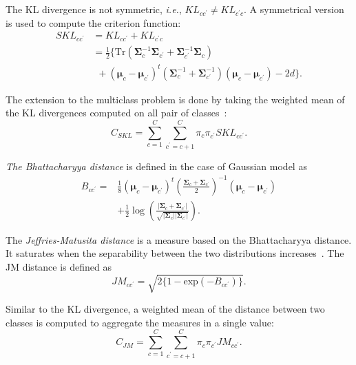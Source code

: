 \documentclass[journal,10pt]{IEEEtran}
\begin{document}
        The    KL   divergence    is   not    symmetric,   \emph{i.e.},
        $KL_{cc^\prime} \ne KL_{c^\prime c}$.  A symmetrical version  is used to
        compute the criterion function:
        \begin{align}\label{eq:skl}
          SKL_{cc^\prime} &=KL_{cc^\prime} + KL_{c^\prime c} \nonumber \\
            &= \frac{1}{2} \biggl\{ \text{Tr} (\boldsymbol{\Sigma}_c^{-1} \boldsymbol{\Sigma}_{c^\prime} + \boldsymbol{\Sigma}_{c^\prime}^{-1} \boldsymbol{\Sigma}_c) \nonumber \\
            &~~+ (\boldsymbol{\mu}_c - \boldsymbol{\mu}_{c^\prime})^t (\boldsymbol{\Sigma}_c^{-1} + \boldsymbol{\Sigma}_{c^\prime}^{-1}) (\boldsymbol{\mu}_c - \boldsymbol{\mu}_{c^\prime}) - 2d \biggr\}.
        \end{align}

        The extension  to the multiclass  problem is done  by taking
        the weighted mean  of the KL divergences computed  on all pair
        of classes~\cite{bruzzone1995extension}:
        \begin{equation}
            C_{SKL} = \sum_{c=1}^{C} \sum_{c^\prime = c + 1}^{C} \pi_c \pi_{c^\prime} SKL_{cc^\prime}.
        \end{equation}

        \emph{The Bhattacharyya distance} is defined in the case of Gaussian model as
        \begin{align}
            {B}_{cc^\prime} = &\frac{1}{8} (\boldsymbol{\mu}_c - \boldsymbol{\mu}_{c^\prime})^t \left( \frac{\boldsymbol{\Sigma}_c + \boldsymbol{\Sigma}_{c^\prime}}{2} \right)^{-1} (\boldsymbol{\mu}_c - \boldsymbol{\mu}_{c^\prime}) \nonumber \\
            &+ \frac{1}{2} \log \left( \frac{|\boldsymbol{\Sigma}_c + \boldsymbol{\Sigma}_{c^\prime}|}{\sqrt{|\boldsymbol{\Sigma}_c| |\boldsymbol{\Sigma}_{c^\prime}|}} \right).
        \end{align}

        The \emph{Jeffries-Matusita distance} is a measure based on the Bhattacharyya distance. It saturates when the separability between the two distributions increases~\cite{bruzzone2009novel}. The JM distance is defined as
        \begin{equation}\label{eq:jm}
            {JM}_{cc^\prime} = \sqrt{ 2 \{1 - \text{exp}(-B_{cc^\prime})\} }.
        \end{equation}

        Similar to the KL divergence,  a weighted mean of the distance
        between two classes is computed to aggregate the measures in a
        single value:
        \begin{equation}
            {C}_{JM} = \sum_{c=1}^{C} \sum_{c^{\prime} = c + 1}^{C} \pi_c \pi_{c^\prime} {JM}_{cc^\prime}.
        \end{equation}
\end{document}
